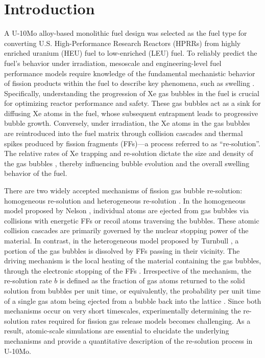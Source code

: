 \documentclass[review]{elsarticle}
\begin{document}
\linenumbers

\section{Introduction}

A U-10Mo alloy-based monolithic fuel design was selected
as the fuel type for converting U.S. High-Performance Research Reactors (HPRRs)
\cite{meyer2014} from highly enriched uranium (HEU) fuel
to low-enriched (LEU) fuel.
To reliably predict the fuel's behavior under irradiation,
mesoscale and engineering-level fuel performance models require
knowledge of the fundamental mechanistic behavior of fission products
within the fuel to describe key phenomena,
such as swelling \cite{beeler2018gb, annualreport2021}.
Specifically, understanding the progression of Xe gas bubbles in the fuel
is crucial for optimizing reactor performance and safety.
These gas bubbles act as a sink for diffusing Xe atoms in the fuel,
whose subsequent entrapment leads to progressive bubble growth.
Conversely, under irradiation, the Xe atoms in the gas bubbles are reintroduced
into the fuel matrix through collision cascades and thermal spikes
produced by fission fragments (FFs)---a process referred to as ``re-solution''.
The relative rates of Xe trapping and re-solution
dictate the size and density of the gas bubbles
\cite{ye2023, olander2006re, parfitt2008},
thereby influencing bubble evolution
and the overall swelling behavior of the fuel.

There are two widely accepted mechanisms of fission gas bubble re-solution:
homogeneous re-solution and heterogeneous re-solution \cite{olander2006re}.
In the homogeneous model proposed by Nelson \cite{nelson1969},
individual atoms are ejected from gas bubbles via collisions
with energetic FFs or recoil atoms traversing the bubbles.
These atomic collision cascades are primarily
governed by the nuclear stopping power of the material.
In contrast,
in the heterogeneous model proposed by Turnbull \cite{turnbull1971},
a portion of the gas bubbles is dissolved by FFs passing in their vicinity.
The driving mechanism is
the local heating of the material containing the gas bubbles,
through the electronic stopping of the FFs \cite{setyawan2018}.
Irrespective of the mechanism,
the re-solution rate $b$ is defined as
the fraction of gas atoms returned to the solid solution
from bubbles per unit time,
or equivalently, the probability per unit time of
a single gas atom being ejected from a bubble back into the lattice
\cite{olander2006re, setyawan2018}.
Since both mechanisms occur on very short timescales,
experimentally determining the re-solution rates
required for fission gas release models becomes challenging.
As a result, atomic-scale simulations are essential
to elucidate the underlying mechanisms
and provide a quantitative description of the re-solution process in U-10Mo.
\end{document}

